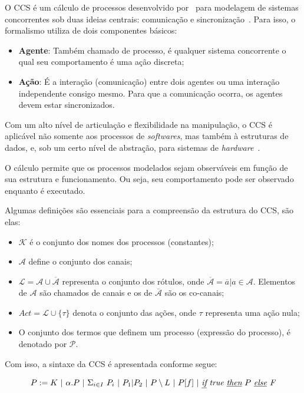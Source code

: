 O CCS é um cálculo de processos desenvolvido por~\citeauthor{milner1986ccs} para modelagem de sistemas concorrentes sob duas ideias centrais: comunicação e sincronização~\cite{milner1986ccs}. Para isso, o formalismo utiliza de dois componentes básicos:

\begin{itemize}
	\item \textbf{Agente}: Também chamado de processo, é qualquer sistema concorrente o qual seu comportamento é uma ação discreta;
	\item \textbf{Ação}: É a interação (comunicação) entre dois agentes ou uma interação independente consigo mesmo. Para que a comunicação ocorra, os agentes devem estar sincronizados. 
\end{itemize}

Com um alto nível de articulação e flexibilidade na manipulação, o CCS é aplicável não somente aos processos de \textit{softwares}, mas também à estruturas de dados, e, sob um certo nível de abstração, para sistemas de \textit{hardware}~\cite{milner1986ccs}. 

O cálculo permite que os processos modelados sejam observáveis em função de sua estrutura e funcionamento. Ou seja, seu comportamento pode ser observado enquanto é executado.

Algumas definições são essenciais para a compreensão da estrutura do CCS, são elas:

\begin{itemize}
	\item $\mathcal{K}$ é o conjunto dos nomes dos  processos (constantes);
	\item $\mathcal{A}$ define o conjunto dos canais;
	\item $\mathcal{L} = \mathcal{A} \cup \mathcal{\overline{A}}$ representa o conjunto dos rótulos, onde $\mathcal{\overline{A}} = \overline{a} | a \in \mathcal{A}$. Elementos de $\mathcal{A}$ são chamados de canais e os de $\mathcal{\overline{A}}$ são os co-canais;
	\item $Act = \mathcal{L} \cup \{\tau\}$ denota o conjunto das ações, onde $\tau$ representa uma ação nula;
	\item O conjunto dos termos que definem um processo (expressão do processo), é denotado por $\mathcal{P}$. 		
\end{itemize}

Com isso, a sintaxe da CCS é apresentada conforme segue:

\begin{equation}
	P := K~|
	~\alpha.P~|
	~\Sigma_{i\in I}~P_{i}~|
	~P_{1} | P_{2}~|
	~P \setminus L~|
	~P[f]~|
	~\textit{\underline{if}}~\textit{true}~\textit{\underline{then}}~P~\textit{\underline{else}~F}
\end{equation}

